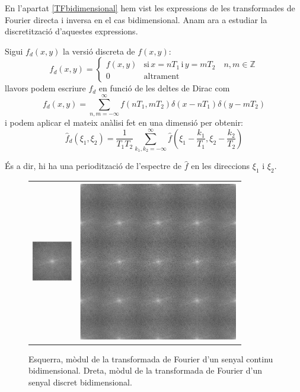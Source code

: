 \documentclass{article}
\def\Z{\mathbb Z}
\begin{document}
En l'apartat \ref{TFbidimensional} hem vist les expressions de les transformades de Fourier
directa i inversa en el cas bidimensional. Anam ara a estudiar la discretitzaci\'o 
d'aquestes expressions.

Sigui $f_d(x,y)$ la versi\'o discreta de $f(x,y)$:
\[
f_d(x,y)=\begin{cases} f(x,y) & \mathrm{si} \, x=nT_1 \, \mathrm{i} \, y=mT_2
\quad n,m \in \Z \\
0 & \mathrm{altrament}
\end{cases}
\]
\noindent
llavors podem escriure $f_d$ en funci\'o de les deltes de Dirac com
\[
f_d(x,y)=\sum_{n,m=-\infty}^{\infty} f(nT_1, mT_2) \delta(x-nT_1) \delta(y-mT_2)
\]
\noindent
i podem aplicar el mateix an\`alisi fet en una dimensi\'o per obtenir:
\[
\hat{f}_d(\xi_1, \xi_2)=\frac{1}{T_1 T_2} \sum_{k_1, k_2=-\infty}^{\infty} 
\hat{f}(\xi_1-\frac{k_1}{T_1}, \xi_2-\frac{k_2}{T_2})
\]

\'Es a dir, hi ha una perioditzaci\'o de l'espectre de $\hat{f}$ en les direccions
$\xi_1$ i $\xi_2$.

\begin{figure}[htbp]
\begin{center}
\begin{tabular}{cc}
\includegraphics[width=1.75cm]{imatges/espectre2D.eps} &
\includegraphics[width=7cm]{imatges/espectre2Dm.eps}
\end{tabular}
\caption{Esquerra, m\`odul de la transformada de Fourier d'un senyal continu 
bidimensional.
Dreta, m\`odul de la transformada de Fourier d'un senyal discret bidimensional.}
\end{center}
\end{figure}
\end{document}
